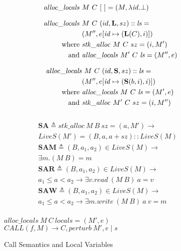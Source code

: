 \documentclass{article}
\begin{document}
\begin{figure}

  \begin{minipage}{0.4\textwidth}
  \[\begin{split}
  \mathit{alloc\_locals} ~ & M ~ C ~ [~] = (M, \lambda \mathit{id} . \bot) \\[0.75em]
  \mathit{alloc\_locals} ~ & M ~ C ~ (id,\mathbf{L},sz)::\mathit{ls} = \\
  & (M'', e[\mathit{id} \mapsto (\mathbf{L}(C),i)]) \\
  \textnormal{where } & \mathit{stk\_alloc} ~ M ~ C ~ sz = (i, M') \\
  \textnormal{and } & \mathit{alloc\_locals} ~ M' ~ C ~ \mathit{ls} = (M'', e) \\[0.75em]
  \mathit{alloc\_locals} & ~ M ~ C ~ (id,\mathbf{S},sz)::\mathit{ls} = \\
  & (M'', e[\mathit{id} \mapsto (\mathbf{S}(b,i),i)]) \\
  \textnormal{where } & \mathit{alloc\_locals} ~ M ~ C ~ \mathit{ls} = (M', e) \\
  \textnormal{and } & \mathit{stk\_alloc} ~ M' ~ C ~ sz = (i, M'') \\[0.75em]
  \end{split}\]
  \end{minipage}
  \begin{minipage}{0.6\textwidth}
  \[\begin{aligned}\mathbf{SA} \triangleq 
  \mathit{stk\_alloc} ~ M ~ B ~ sz = (a, M') \rightarrow & \\
  \mathit{LiveS}(M') = (B,a,a+sz)::\mathit{LiveS}(M) & \\[0.75em]
  \mathbf{SAM} \triangleq
  (B,a_1, a_2) \in LiveS(M) \rightarrow & \\
  \exists m . (M ~ B) = m & \\[0.75em]
  \mathbf{SAR} \triangleq
  (B,a_1, a_2) \in LiveS(M) \rightarrow & \\
  a_1 \leq a < a_2 \rightarrow \exists v . \mathit{read} ~ (M ~ B) ~ a = v & \\[0.75em]
  \mathbf{SAW} \triangleq
  (B,a_1, a_2) \in LiveS(M) \rightarrow & \\
  a_1 \leq a < a_2 \rightarrow \exists m . \mathit{write} ~ (M ~ B) ~ a ~ v = m & \\[0.75em]
  \end{aligned}\]
  \end{minipage}
      
              {\(\mathit{alloc\_locals} ~ M ~ C ~ \mathit{locals} = (M',e)\)}
              {\(\mathit{CALL}(f,M) \longrightarrow
                C,\mathit{perturb} ~ M',e \mid s\)}

  \caption{Call Semantics and Local Variables}
  \label{fig:callret}

\end{figure}
\end{document}
